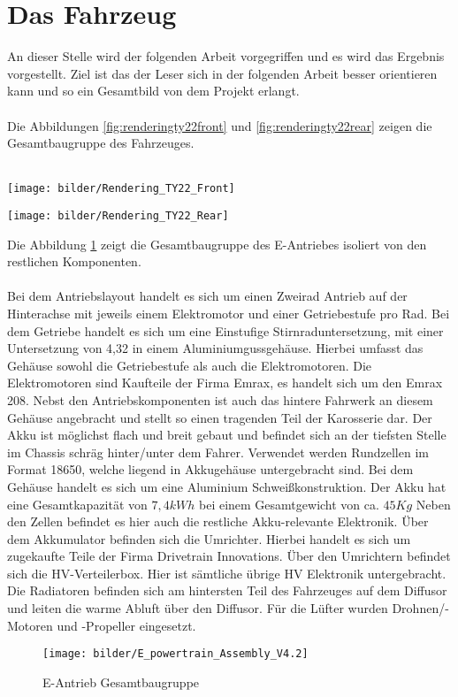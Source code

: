 \section{Das Fahrzeug}
An dieser Stelle wird der folgenden Arbeit vorgegriffen und es wird das Ergebnis vorgestellt. Ziel ist das der Leser sich in der folgenden Arbeit besser orientieren kann und so ein Gesamtbild von dem Projekt erlangt.\\
\\
Die Abbildungen \ref{fig:renderingty22front} und \ref{fig:renderingty22rear} zeigen die Gesamtbaugruppe des Fahrzeuges.\\
\\
	\begin{minipage}[b]{.5\linewidth} %
			\texttt{[image: bilder/Rendering\_TY22\_Front]}
			\label{fig:renderingty22front}
	\end{minipage}
	\begin{minipage}[b]{.5\linewidth} %
			\texttt{[image: bilder/Rendering\_TY22\_Rear]}
			\label{fig:renderingty22rear}
	\end{minipage}

Die Abbildung \ref{fig:epowertrainassemblyv4} zeigt die Gesamtbaugruppe des E-Antriebes isoliert von den restlichen Komponenten.\\
\\
Bei dem Antriebslayout handelt es sich um einen Zweirad Antrieb auf der Hinterachse mit jeweils einem Elektromotor und einer Getriebestufe pro Rad. Bei dem Getriebe handelt es sich um eine Einstufige Stirnraduntersetzung, mit einer Untersetzung von 4,32 in einem Aluminiumgussgehäuse. Hierbei umfasst das Gehäuse sowohl die Getriebestufe als auch die Elektromotoren. Die Elektromotoren sind Kaufteile der Firma Emrax, es handelt sich um den Emrax 208. Nebst den Antriebskomponenten ist auch das hintere Fahrwerk an diesem Gehäuse angebracht und stellt so einen tragenden Teil der Karosserie dar. Der Akku ist möglichst flach und breit gebaut und befindet sich an der tiefsten Stelle im Chassis schräg hinter/unter dem Fahrer. Verwendet werden Rundzellen im Format 18650, welche liegend in Akkugehäuse untergebracht sind. Bei dem Gehäuse handelt es sich um eine Aluminium Schweißkonstruktion. Der Akku hat eine Gesamtkapazität von \ensuremath{7,4 kWh} bei einem Gesamtgewicht von ca. \ensuremath{45 Kg} Neben den Zellen befindet es hier auch die restliche Akku-relevante Elektronik. Über dem Akkumulator befinden sich die Umrichter. Hierbei handelt es sich um zugekaufte Teile der Firma Drivetrain Innovations. Über den Umrichtern befindet sich die \ac{HV}-Verteilerbox. Hier ist sämtliche übrige \ac{HV} Elektronik untergebracht. Die Radiatoren befinden sich am hintersten Teil des Fahrzeuges auf dem Diffusor und leiten die warme Abluft über den Diffusor. Für die Lüfter wurden Drohnen/-Motoren und -Propeller eingesetzt.

\begin{figure}
	\centering
	\texttt{[image: bilder/E\_powertrain\_Assembly\_V4.2]}
	\caption{E-Antrieb Gesamtbaugruppe}
	\label{fig:epowertrainassemblyv4}
\end{figure}

\FloatBarrier